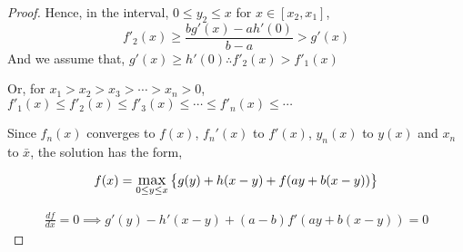 \begin{proof}
    Hence, in the interval, $0 \le y_2 \le x$ for $x \in [x_2, x_1]$,
    $$
        f'_2(x) \ge \frac{bg'(x) - ah'(0)}{b-a} > g'(x)
    $$
    And we assume that, $g'(x) \ge h'(0) \therefore f'_2(x) > f'_1(x)$

    Or, for $x_1 > x_2 > x_3 > \cdots > x_n > 0$, $f'_1(x) \le f'_2(x) \le f'_3(x) \le \cdots \le f'_{n}(x) \le \cdots$
    
    \vspace{5mm}
    Since $f_n (x)$ converges to $f(x)$, $f_n' (x)$ to $f' (x)$, $y_n (x)$ to $y (x)$ and $x_n$ to $\bar{x}$, the solution has the form, 

    $$
    f(x) = \mathlarger{\max}_{0 \le y \le x} \left\{ g(y) + h(x-y) + f(ay+b(x-y)) \right\}
    $$

    \begin{align*}
        \frac{df}{dx} = 0 
        \implies g'(y)-h'(x-y)+(a-b)f'(ay+b(x-y))=0
    \end{align*}
\end{proof}

